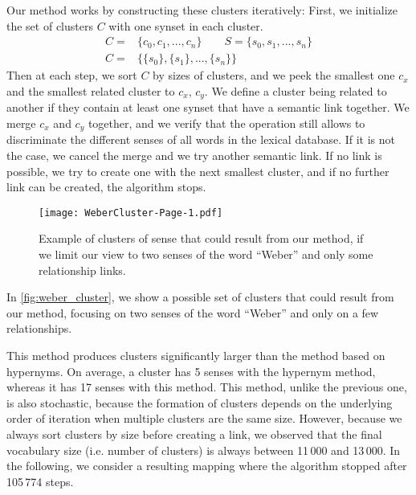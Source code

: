 \documentclass[11pt]{article}
\begin{document}
Our method works by constructing these clusters iteratively: First, we initialize the set of clusters $C$ with one synset in each cluster.
\begin{align}
    C=&\{c_0, c_1, ..., c_n\} \quad \quad S=\{s_0, s_1, ..., s_n\} \nonumber \\
    C=&\{\{s_0\},\{s_1\},...,\{s_n\}\} \nonumber
\end{align}
Then at each step, we sort $C$ by sizes of clusters, and we peek the smallest one $c_x$ and the smallest related cluster to $c_x$, $c_y$. We define a cluster being related to another if they contain at least one synset that have a semantic link together.
We merge $c_x$ and $c_y$ together, and we verify that the operation still allows to discriminate the different senses of all words in the lexical database. If it is not the case, we cancel the merge and we try another semantic link. If no link is possible, we try to create one with the next smallest cluster, and if no further link can be created, the algorithm stops.




\begin{figure}[htbp]
\centering
\texttt{[image: WeberCluster-Page-1.pdf]}
\caption{Example of clusters of sense that could result from our method, if we limit our view to two senses of the word ``Weber'' and only some relationship links.}
\label{fig:weber_cluster}
\end{figure}

In \autoref{fig:weber_cluster}, we show a possible set of clusters that could result from our method, focusing on two senses of the word ``Weber'' and only on a few relationships. 




This method produces clusters significantly larger than the method based on hypernyms. On average, a cluster has 5 senses with the hypernym method, whereas it has 17 senses with this method. This method, unlike the previous one, is also stochastic, because the formation of clusters depends on the underlying order of iteration when multiple clusters are the same size. However, because we always sort clusters by size before creating a link, we observed that the final vocabulary size (i.e. number of clusters) is always between 11\,000 and 13\,000.
In the following, we consider a resulting mapping where the algorithm stopped after 105\,774 steps.
\end{document}
